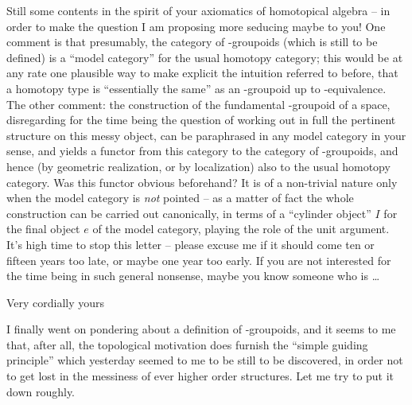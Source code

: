 Still some contents in the spirit of your axiomatics of homotopical
algebra -- in order to make the question I am proposing more seducing
maybe to you! One comment is that presumably, the category of
\oo-groupoids (which is still to be defined) is a ``model category''
for the usual homotopy category; this would be at any rate one
plausible way to make explicit the intuition referred to before, that
a homotopy type is ``essentially the same'' as an \oo-groupoid up to
\oo-equivalence. The other comment: the construction of the
fundamental \oo-groupoid of a space, disregarding for the time being
the question of working out in full the pertinent structure on this
messy object, can be paraphrased in any model category in your sense,
and yields a functor from this category to the category of
\oo-groupoids, and hence (by geometric realization, or by
localization) also to the usual homotopy category. Was this functor
obvious beforehand? It is of a non-trivial nature only when the model
category is \emph{not} pointed -- as a matter of fact the whole
construction can be carried out canonically, in terms of a ``cylinder
object'' $I$ for the final object $e$ of the model category, playing
the role of the unit argument.
It's high time to stop this letter -- please excuse me if it should
come ten or fifteen years too late, or maybe one year too early. If
you are not interested for the time being in such general nonsense,
maybe you know someone who is \ldots

\bigskip

Very cordially yours

\bigbreak

\presectionfill{}\par

I finally went on pondering about a definition of
\oo-groupoids, and it seems to me that, after all, the topological
motivation does furnish the ``simple guiding principle'' which
yesterday seemed to me to be still to be discovered, in order not to
get lost in the messiness of ever higher order structures. Let me try
to put it down roughly.

